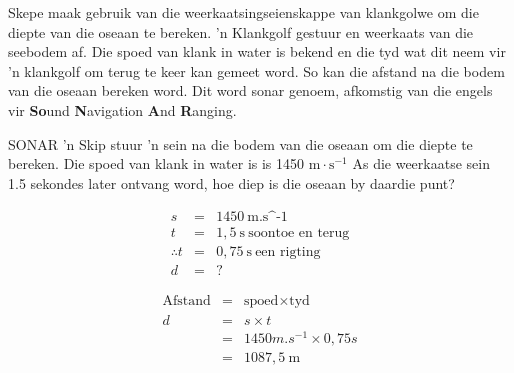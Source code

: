 \begin{minipage}{.5\textwidth}
\begin{figure}[H]
\begin{center}
\end{center}
\end{figure}       
\end{minipage}
\begin{minipage}{.5\textwidth}
Skepe maak gebruik van die weerkaatsingseienskappe van klankgolwe om die diepte van die oseaan te bereken. 'n Klankgolf gestuur en weerkaats van die seebodem af. Die spoed van klank in water is bekend en die tyd wat dit neem vir 'n klankgolf om terug te keer kan gemeet word. So kan die afstand na die bodem van die oseaan bereken word. Dit word sonar genoem, afkomstig van die engels vir \textbf{So}und \textbf{N}avigation \textbf{A}nd \textbf{R}anging.\par    
 \end{minipage}
            

\begin{wex}{SONAR}{ 'n Skip stuur 'n sein na die bodem van die oseaan om die diepte te bereken. Die spoed van klank in water is is 1450 $\text{m}\cdot\text{s}^{-1}$ As die weerkaatse sein 1.5 sekondes later ontvang word, hoe diep is die oseaan by daardie punt?}{
\begin{eqnarray*}
s &=& 1450 \ \text{m.s^{-1}}\\
t &=& 1,5 \ \text{s} \ \text{soontoe \ en \ terug}\\
\therefore t &= & 0,75 \ \text{s} \ \text{een \ rigting}\\
d &=& ?
\end{eqnarray*}

\begin{eqnarray*}
\text{Afstand} &=& \text{spoed} \times \text{tyd} \\
d &=& s \times t \\
&=& 1450 m.s^{-1} \times 0,75 s \\
&=& 1087,5 \ \text{m}
\end{eqnarray*}
}\end{wex}
          
